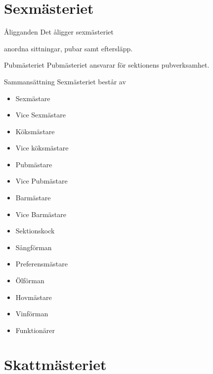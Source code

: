 \documentclass[pdfbookmarks,a4paper,11pt]{article}
\newlength{\itemcollength}
\newenvironment{reglemlista}{%
  \begin{list}{}{%
      \setlength{\labelwidth}{\itemcollength}%
      \setlength{\leftmargin}{\labelwidth + \labelsep}%
      \renewcommand{\makelabel}[1]{%
        \raisebox{0pt}[1ex][0pt]{%
          \makebox[\labelwidth][l]{%
            \parbox[t]{\itemcollength}{%
              \raggedright\hspace{0pt}##1}}}\hfill}%
      }}{%
  \end{list}}
\begin{document}
\section{Sexmästeriet}

\begin{reglemlista}

	\item[Åligganden]
	Det åligger sexmästeriet
	\begin{attlista}
		\item  anordna sittningar, pubar samt eftersläpp.
	\end{attlista}

	\item[Pubmästeriet]
	Pubmästeriet ansvarar för sektionens pubverksamhet.

	\item[Sammansättning]
	Sexmästeriet består av
	\begin{itemize}
		\item Sexmästare
		\item Vice Sexmästare
		\item Köksmästare
		\item Vice köksmästare
		\item Pubmästare
		\item Vice Pubmästare
		\item Barmästare
		\item Vice Barmästare
		\item Sektionskock
		\item Sångförman
		\item Preferensmästare
		\item Ölförman
		\item Hovmästare
		\item Vinförman
		\item Funktionärer
	\end{itemize}
\end{reglemlista}

\section{Skattmästeriet}
\end{document}
